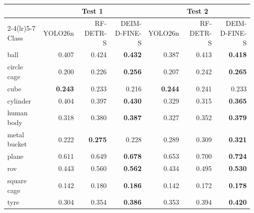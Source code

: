 \begin{tabular}{lrrrrrr}
\toprule
 & \multicolumn{3}{c}{Test 1} & \multicolumn{3}{c}{Test 2} \\
\cmidrule(lr){2-4}\cmidrule(lr){5-7}
Class & YOLO26n & RF-DETR-S & DEIM-D-FINE-S & YOLO26n & RF-DETR-S & DEIM-D-FINE-S \\
\midrule
ball & 0.407 & 0.424 & \textbf{0.432} & 0.387 & 0.413 & \textbf{0.418} \\
circle cage & 0.200 & 0.226 & \textbf{0.256} & 0.207 & 0.242 & \textbf{0.265} \\
cube & \textbf{0.243} & 0.233 & 0.216 & \textbf{0.244} & 0.241 & 0.233 \\
cylinder & 0.404 & 0.397 & \textbf{0.430} & 0.329 & 0.315 & \textbf{0.365} \\
human body & 0.318 & 0.380 & \textbf{0.387} & 0.327 & 0.352 & \textbf{0.379} \\
metal bucket & 0.222 & \textbf{0.275} & 0.228 & 0.289 & 0.309 & \textbf{0.321} \\
plane & 0.611 & 0.649 & \textbf{0.678} & 0.653 & 0.700 & \textbf{0.724} \\
rov & 0.443 & 0.560 & \textbf{0.562} & 0.434 & 0.495 & \textbf{0.530} \\
square cage & 0.142 & 0.180 & \textbf{0.186} & 0.142 & 0.172 & \textbf{0.178} \\
tyre & 0.304 & 0.354 & \textbf{0.386} & 0.353 & 0.394 & \textbf{0.420} \\
\bottomrule
\end{tabular}
